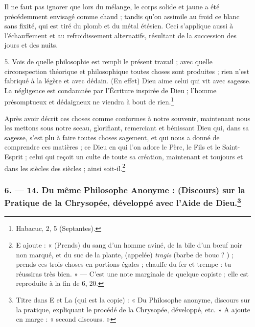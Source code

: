 \documentclass[a4paper, 11pt, oneside, polutonikogreek, french]{article}
\begin{document}
Il ne faut pas ignorer que lors du mélange, le corps solide et jaune a été précédemment envisagé comme chaud ; tandis qu'on assimile au froid ce blanc sans fixité, qui est tiré du plomb et du métal étésien. Ceci s'applique aussi à l'échauffement et au refroidissement alternatifs, résultant de la succession des jours et des nuits.

5. Vois de quelle philosophie est rempli le présent travail ; avec quelle circonspection théorique et philosophique toutes choses sont produites ; rien n'est fabriqué à la légère et avec dédain. (En effet) Dieu aime celui qui vit avec sagesse. La négligence est condamnée par l'Écriture inspirée de Dieu ; l'homme présomptueux et dédaigneux ne viendra à bout de rien.\footnote{Habacuc, 2, 5 (Septantes).}

Après avoir décrit ces choses comme conformes à notre souvenir, maintenant nous les mettons sous notre sceau, glorifiant, remerciant et bénissant Dieu qui, dans sa sagesse, s'est plu à faire toutes choses sagement, et qui nous a donné de comprendre ces matières ; ce Dieu en qui l'on adore le Père, le Fils et le Saint-Esprit ; celui qui reçoit un culte de toute sa création, maintenant et toujours et dans les siècles des siècles ; ainsi soit-il.\footnote{E ajoute : « (Prends) du sang d'un homme aviné, de la bile d'un bœuf noir non marqué, et du suc de la plante, (appelée) \emph{tragis} (barbe de bouc ? ) ; prends ces trois choses en portions égales ; chauffe du fer et trempe : tu réussiras très bien. » --- C'est une note marginale de quelque copiste ; elle est reproduite à la fin de 6, 20.}

\bigskip
\centerline{\EightStarTaper}
\centerline{\EightStarTaper\EightStarTaper}
\bigskip

\subsubsection[6. --- 14. Du même Philosophe Anonyme : (Discours) sur la Pratique de la Chrysopée, développé avec l'Aide de Dieu.]{6. --- 14. Du même Philosophe Anonyme : (Discours) sur la Pratique de la Chrysopée, développé avec l'Aide de Dieu.\footnote{Titre dans E et La (qui est la copie) : « Du Philosophe anonyme, discours sur la pratique, expliquant le procédé de la Chrysopée, développé, etc. » A ajoute en marge : « second discours. »}}
\end{document}
